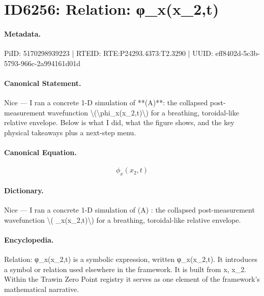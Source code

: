 \section*{ID6256: Relation: φ\_x(x\_2,t)}
\paragraph{Metadata.}
PiID: 5170298939223 | RTEID: RTE:P24293.4373:T2.3290 | UUID: eff8402d-5c3b-5793-966c-2a994161d01d

\paragraph{Canonical Statement.}
Nice — I ran a concrete 1-D simulation of **(A)**: the collapsed post-measurement wavefunction \textbackslash{}(\textbackslash{}phi\_x(x\_2,t)\textbackslash{}) for a breathing, toroidal-like relative envelope. Below is what I did, what the figure shows, and the key physical takeaways plus a next-step menu.

\paragraph{Canonical Equation.}
\[
\phi_x(x_2,t)
\]

\paragraph{Dictionary.}
Nice — I ran a concrete 1-D simulation of (A) : the collapsed post-measurement wavefunction \textbackslash{}( \_x(x\_2,t)\textbackslash{}) for a breathing, toroidal-like relative envelope.

\paragraph{Encyclopedia.}
Relation: φ\_x(x\_2,t) is a symbolic expression, written φ\_x(x\_2,t). It introduces a symbol or relation used elsewhere in the framework. It is built from x, x\_2. Within the Trawin Zero Point registry it serves as one element of the framework's mathematical narrative.
